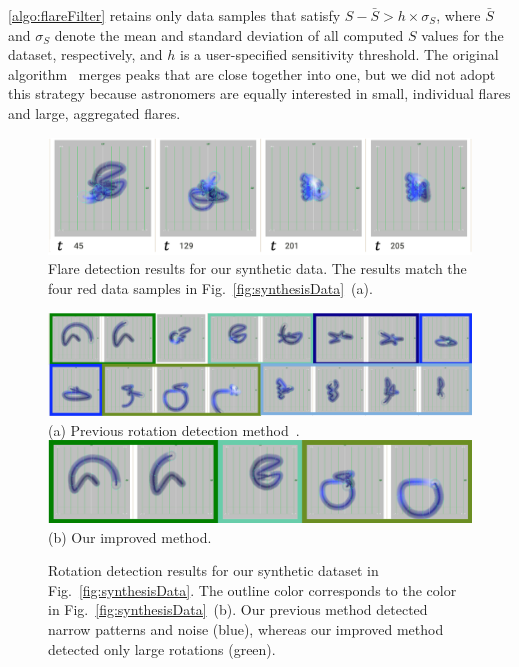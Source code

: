 \ref{algo:flareFilter} retains only data samples that satisfy $S - \bar{S} > h \times \sigma_{S}$, 
where $\bar{S}$ and $\sigma_{S}$ denote the mean and standard deviation of all computed $S$ values for the dataset, respectively, 
and $h$ is a user-specified sensitivity threshold. 
The original algorithm~\cite{Palshikar2009} merges peaks that are close together into one, 
but we did not adopt this strategy
because astronomers are equally interested in small, individual flares and large, aggregated flares.


\begin{figure}[tb]
    \centering
    \includegraphics[width=.85\linewidth]{vgtc_journal_latex/figures/flareDetectiondemodataResults.png}
    \caption{Flare detection results for our synthetic data. The results match the four red data samples in Fig.~\ref{fig:synthesisData}~(a).}
    \label{fig:flareDetection}
\end{figure}
\begin{figure}[tb]
    \centering
    \includegraphics[width=\linewidth]{vgtc_journal_latex/figures/rotationDetectiondemodataResultsOR.png}\\
    \footnotesize{\sf(a) Previous rotation detection method~\cite{Fujishiro2018}.}\\
    \includegraphics[width=.8\linewidth]{vgtc_journal_latex/figures/rotationDetectiondemodataResults.png}\\
    \footnotesize{\sf(b) Our improved method.}
    \caption{Rotation detection results for our synthetic dataset in Fig.~\ref{fig:synthesisData}. 
        The outline color corresponds to the color in Fig.~\ref{fig:synthesisData}~(b).
        Our previous method detected narrow patterns and noise (blue), 
        whereas our improved method detected only large rotations (green).}
    \label{fig:rotationResults}
\end{figure}

